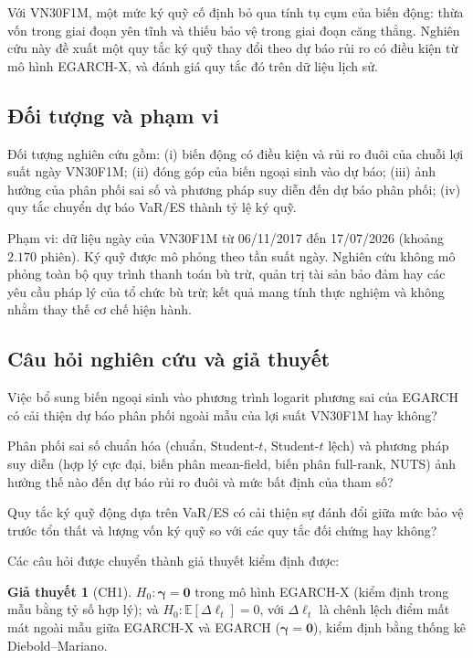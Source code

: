 \documentclass[12pt,a4paper]{article}
\theoremstyle{definition}
\newtheorem{giathuyet}{Giả thuyết}
\theoremstyle{remark}
\newcommand{\E}{\mathbb{E}}
\newcommand{\bgamma}{\boldsymbol{\gamma}}
\begin{document}
Với VN30F1M, một mức ký quỹ cố định bỏ qua tính tụ cụm của biến động: thừa vốn trong giai đoạn yên tĩnh và thiếu bảo vệ trong giai đoạn căng thẳng. Nghiên cứu này đề xuất một quy tắc ký quỹ thay đổi theo dự báo rủi ro có điều kiện từ mô hình EGARCH-X, và đánh giá quy tắc đó trên dữ liệu lịch sử.

\subsection{Đối tượng và phạm vi}

Đối tượng nghiên cứu gồm: (i) biến động có điều kiện và rủi ro đuôi của chuỗi lợi suất ngày VN30F1M; (ii) đóng góp của biến ngoại sinh vào dự báo; (iii) ảnh hưởng của phân phối sai số và phương pháp suy diễn đến dự báo phân phối; (iv) quy tắc chuyển dự báo VaR/ES thành tỷ lệ ký quỹ.

Phạm vi: dữ liệu ngày của VN30F1M từ 06/11/2017 đến 17/07/2026 (khoảng $2.170$ phiên). Ký quỹ được mô phỏng theo tần suất ngày. Nghiên cứu không mô phỏng toàn bộ quy trình thanh toán bù trừ, quản trị tài sản bảo đảm hay các yêu cầu pháp lý của tổ chức bù trừ; kết quả mang tính thực nghiệm và không nhằm thay thế cơ chế hiện hành.

\subsection{Câu hỏi nghiên cứu và giả thuyết}

\begin{description}[leftmargin=0pt]
\item[CH1.] Việc bổ sung biến ngoại sinh vào phương trình logarit phương sai của EGARCH có cải thiện dự báo phân phối ngoài mẫu của lợi suất VN30F1M hay không?
\item[CH2.] Phân phối sai số chuẩn hóa (chuẩn, Student-$t$, Student-$t$ lệch) và phương pháp suy diễn (hợp lý cực đại, biến phân mean-field, biến phân full-rank, NUTS) ảnh hưởng thế nào đến dự báo rủi ro đuôi và mức bất định của tham số?
\item[CH3.] Quy tắc ký quỹ động dựa trên VaR/ES có cải thiện sự đánh đổi giữa mức bảo vệ trước tổn thất và lượng vốn ký quỹ so với các quy tắc đối chứng hay không?
\end{description}

Các câu hỏi được chuyển thành giả thuyết kiểm định được:

\begin{giathuyet}[CH1]\label{gt:1}
$H_0:\bgamma=\mathbf 0$ trong mô hình EGARCH-X (kiểm định trong mẫu bằng tỷ số hợp lý); và $H_0:\E[\Delta\ell_t]=0$, với $\Delta\ell_t$ là chênh lệch điểm mất mát ngoài mẫu giữa EGARCH-X và EGARCH ($\bgamma=\mathbf 0$), kiểm định bằng thống kê Diebold--Mariano.
\end{giathuyet}
\end{document}
